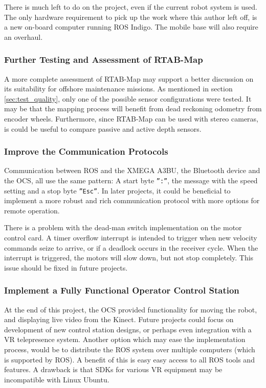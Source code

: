 There is much left to do on the project, even if the current robot system is used. The only hardware requirement to pick up the work where this author left off, is a new on-board computer running \ac{ROS} Indigo. The mobile base will also require an overhaul.

\subsubsection{Further Testing and Assessment of \ac{RTAB-Map}}

A more complete assessment of \ac{RTAB-Map} may support a better discussion on its suitability for offshore maintenance missions. As mentioned in section \ref{sec:test_quality}, only one of the possible sensor configurations were tested. It may be that the mapping process will benefit from dead reckoning odometry from encoder wheels. Furthermore, since \ac{RTAB-Map} can be used with stereo cameras, is could be useful to compare passive and active depth sensors.

\subsubsection{Improve the Communication Protocols}

Communication between \ac{ROS} and the XMEGA A3BU, the Bluetooth device and the \ac{OCS}, all use the same pattern: A start byte \texttt{'':''}, the message with the speed setting and a stop byte \texttt{''Esc''}. In later projects, it could be beneficial to implement a more robust and rich communication protocol with more options for remote operation. 

There is a problem with the dead-man switch implementation on the motor control card. A timer overflow interrupt is intended to trigger when new velocity commands seize to arrive, or if a deadlock occurs in the receiver cycle. When the interrupt is triggered, the motors will slow down, but not stop completely. This issue should be fixed in future projects.

\subsubsection{Implement a Fully Functional Operator Control Station}

At the end of this project, the \ac{OCS} provided functionality for moving the robot, and displaying live video from the Kinect. Future projects could focus on development of new control station designs, or perhaps even integration with a \ac{VR} telepresence system. Another option which may ease the implementation process, would be to distribute the \ac{ROS} system over multiple computers (which is supported by \ac{ROS}). A benefit of this is easy easy access to all \ac{ROS} tools and features. A drawback is that SDKs for various \ac{VR} equipment may be incompatible with Linux Ubuntu. 

